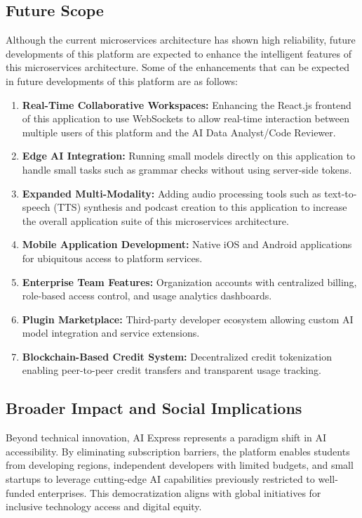 \documentclass[conference]{IEEEtran}
\begin{document}
\subsection{Future Scope}
Although the current microservices architecture has shown high reliability, future developments of this platform are expected to enhance the intelligent features of this microservices architecture. Some of the enhancements that can be expected in future developments of this platform are as follows:
\begin{enumerate}
    \item \textbf{Real-Time Collaborative Workspaces:} Enhancing the React.js frontend of this application to use WebSockets to allow real-time interaction between multiple users of this platform and the AI Data Analyst/Code Reviewer.
    \item \textbf{Edge AI Integration:} Running small models directly on this application to handle small tasks such as grammar checks without using server-side tokens.
    \item \textbf{Expanded Multi-Modality:} Adding audio processing tools such as text-to-speech (TTS) synthesis and podcast creation to this application to increase the overall application suite of this microservices architecture.
    \item \textbf{Mobile Application Development:} Native iOS and Android applications for ubiquitous access to platform services.
    \item \textbf{Enterprise Team Features:} Organization accounts with centralized billing, role-based access control, and usage analytics dashboards.
    \item \textbf{Plugin Marketplace:} Third-party developer ecosystem allowing custom AI model integration and service extensions.
    \item \textbf{Blockchain-Based Credit System:} Decentralized credit tokenization enabling peer-to-peer credit transfers and transparent usage tracking.
\end{enumerate}

\subsection{Broader Impact and Social Implications}
Beyond technical innovation, AI Express represents a paradigm shift in AI accessibility. By eliminating subscription barriers, the platform enables students from developing regions, independent developers with limited budgets, and small startups to leverage cutting-edge AI capabilities previously restricted to well-funded enterprises. This democratization aligns with global initiatives for inclusive technology access and digital equity.
\end{document}
